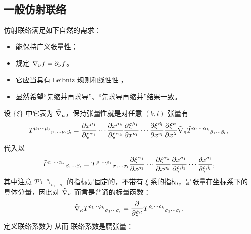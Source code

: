 \subsection{一般仿射联络}\label{sec:connection}

仿射联络满足如下自然的需求：
\begin{itemize}
    \item 能保持广义张量性；
    \item 规定 $\nabla_\nu f = \partial_\nu f$。
    \item 它应当具有 Leibniz 规则和线性性；
    \item 显然希望“先缩并再求导”、“先求导再缩并”结果一致。
\end{itemize}
设 $\{\xi\}$ 中它表为 $\tilde{\nabla}_\mu$，保持张量性就是对任意 $(k,l)$-张量有
\[T^{\mu_1\cdots\mu_k}{}_{\nu_1\cdots\nu_l;\lambda}=\pdv{x^{\mu_1}}{\xi^{\alpha_1}}\cdots\pdv{x^{\mu_k}}{\xi^{\alpha_k}}\pdv{\xi^{\beta_1}}{x^{\nu_1}}\cdots\pdv{\xi^{\beta_l}}{x^{\nu_l}}\pdv{\xi^\kappa}{x^\lambda}\tilde{\nabla}_\kappa\tilde T^{\alpha_1\cdots\alpha_k}{}_{\beta_1\cdots\beta_l},\]
代入以
\[
\tilde T^{\alpha_1\cdots\alpha_k}{}_{\beta_1\cdots\beta_l}=T^{\rho_1\cdots\rho_k}{}_{\sigma_1\cdots\sigma_l}\pdv{\xi^{\alpha_1}}{x^{\rho_1}}\cdots\pdv{\xi^{\alpha_k}}{x^{\rho_k}}\pdv{x^{\sigma_1}}{\xi^{\beta_1}}\cdots\pdv{x^{\sigma_l}}{\xi^{\beta_l}},
\]
其中注意 $T^{\rho_1\cdots\rho_k}{}_{\sigma_1\cdots\sigma_l}$ 的指标是固定的，不带有 $\xi$ 系的指标，是张量在坐标系下的具体分量，因此对 $\tilde{\nabla}_\kappa $ 而言是普通的标量函数：
\[\tilde{\nabla}_\kappa T^{\rho_1\cdots\rho_k}{}_{\sigma_1\cdots\sigma_l} = \pdv{\xi^\kappa} T^{\rho_1\cdots\rho_k}{}_{\sigma_1\cdots\sigma_l}.\]
定义联络系数为
从而
联络系数是赝张量：
